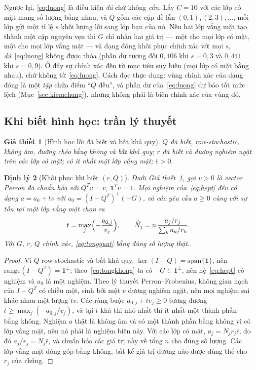 \documentclass[11pt]{article}
\newtheorem{dinhly}{Định lý}
\newtheorem{giathiet}[dinhly]{Giả thiết}
\theoremstyle{remark}
\newcommand{\one}{\mathbf{1}}
\begin{document}
Ngược lại, \eqref{eq:luong} là điều kiện \emph{đủ} chứ không \emph{cần}. Lấy
$C=10$ với các lớp có mặt mang số lượng bằng nhau, và $Q$ gồm các cặp dễ lẫn
$(0,1),(2,3),\ldots$, mỗi lớp gửi một tỉ lệ $s$ khối lượng lỗi sang lớp bạn
của nó. Nếu hai lớp vắng mặt tạo thành một cặp nguyên vẹn thì $G$ chỉ nhận
hai giá trị --- một cho mọi lớp có mặt, một cho mọi lớp vắng mặt --- và dạng
đóng khôi phục chính xác với mọi $s$, \emph{dù}~\eqref{eq:luong} không được
thỏa (phần dư tương đối $0{,}106$ khi $s=0{,}3$ và $0{,}441$ khi $s=0{,}9$).
Ở đây sự chính xác đến từ mục tiêu suy biến (mọi lớp có mặt bằng nhau), chứ
không từ~\eqref{eq:luong}. Cách đọc thực dụng: vùng chính xác của dạng đóng
là một \emph{tập} chứa điểm ``$Q$ đều'', và phần dư của~\eqref{eq:luong} dự
báo tốt mức lệch (Mục~\ref{sec:kiemchung}), nhưng không phải là biên chính
xác của vùng đó.

\subsection{Khi biết hình học: trần lý thuyết}

\begin{giathiet}[Hình học lỗi đã biết và bất khả quy]
\label{gt:hinhhoc}
$Q$ đã biết, row-stochastic, không âm, đường chéo bằng không và bất khả quy;
$r$ đã biết và dương nghiêm ngặt trên các lớp có mặt; có ít nhất một lớp vắng
mặt; $\bar\epsilon>0$.
\end{giathiet}

\begin{dinhly}[Khôi phục khi biết $(r,Q)$]
\label{dl:tongquat}
Dưới Giả thiết~\ref{gt:hinhhoc}, gọi $v>0$ là vector Perron đã chuẩn hóa với
$Q^Tv=v$, $\one^Tv=1$. Mọi nghiệm của~\eqref{eq:hept} đều có dạng
$a = a_0 + tv$ với $a_0 = (I-Q^T)^{+}(-G)$, và các yêu cầu $a \ge 0$ cùng với
sự tồn tại một lớp vắng mặt chọn ra
\begin{equation}
 t = \max_j\Bigl(-\frac{a_{0,j}}{v_j}\Bigr),
 \qquad
 \widehat N_j = n\,\frac{a_j/r_j}{\sum_k a_k/r_k}.
 \label{eq:tongquat}
\end{equation}
Với $G$, $r$, $Q$ chính xác, \eqref{eq:tongquat} bằng đúng số lượng thật.
\end{dinhly}

\begin{proof}
Vì $Q$ row-stochastic và bất khả quy, $\ker(I-Q) = \mathrm{span}\{\one\}$,
nên $\mathrm{range}(I-Q^T) = \one^\perp$; theo~\eqref{eq:tongkhong} ta có
$-G \in \one^\perp$, nên hệ~\eqref{eq:hept} có nghiệm và $a_0$ là một nghiệm.
Theo lý thuyết Perron--Frobenius, không gian hạch của $I-Q^T$ có chiều một,
sinh bởi một $v$ dương nghiêm ngặt, nên mọi nghiệm sai khác nhau một lượng
$tv$. Các ràng buộc $a_{0,j}+tv_j\ge0$
tương đương $t \ge \max_j(-a_{0,j}/v_j)$, và tại $t$ khả thi nhỏ nhất thì ít
nhất một thành phần bằng không. Nghiệm $a$ thật là không âm và có một thành
phần bằng không vì có lớp vắng mặt, nên nó phải là nghiệm biên này. Với các
lớp có mặt, $a_j = N_jr_j\bar\epsilon$, do đó $a_j/r_j = N_j\bar\epsilon$, và
chuẩn hóa các giá trị này về tổng $n$ cho đúng số lượng. Các lớp vắng mặt
đóng góp bằng không, bất kể giá trị dương nào được dùng thế cho $r_j$ của
chúng.
\end{proof}
\end{document}
